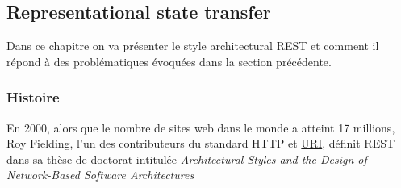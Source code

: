 \subsection{Representational state transfer}
Dans ce chapitre on va présenter le style architectural REST et comment il répond à des problématiques évoquées dans la section précédente. 
\subsubsection{Histoire}
En 2000, alors que le nombre de sites web dans le monde a atteint 17 millions, Roy Fielding, l'un des contributeurs du standard HTTP et \href{https://tools.ietf.org/html/rfc3986}{URI}, définit REST dans sa thèse de doctorat intitulée \emph{Architectural Styles and the Design of Network-Based Software Architectures} \cite{roythesis}






